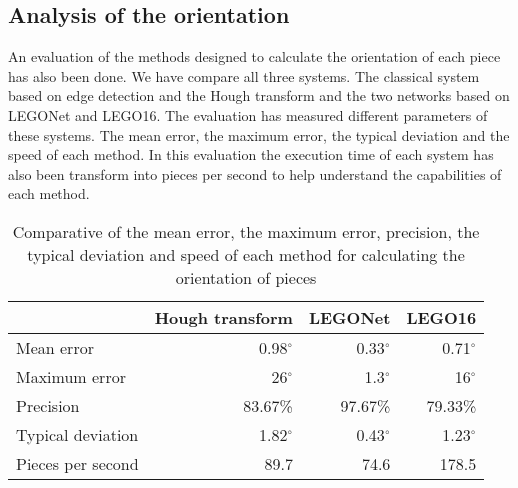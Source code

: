 {%

\subsection*{Analysis of the orientation}
An evaluation of the methods designed to calculate the orientation of each piece has also been done. We have compare all three systems. The classical system based on edge detection and the Hough transform and the two networks based on LEGONet and LEGO16. The evaluation has measured different parameters of these systems. The mean error, the maximum error, the typical deviation and the speed of each method. In this evaluation the execution time of each system has also been transform into pieces per second to help understand the capabilities of each method.

\begin{table}[ht] %
  \centering
    \begin{tabular}{|l|r|r|r|}
    \cline{2-4} \multicolumn{1}{r|}{} & \multicolumn{1}{l|}{Hough transform} & \multicolumn{1}{l|}{LEGONet} & \multicolumn{1}{l|}{LEGO16}\\	
    \hline
    Mean error & 0.98$^{\circ}$  & 0.33$^{\circ}$ & 0.71$^{\circ}$ \\
    \hline
    Maximum error & 26$^{\circ}$  & 1.3$^{\circ}$ & 16$^{\circ}$ \\
    \hline
    Precision & 83.67\% & 97.67\% & 79.33\% \\
    \hline
    Typical deviation & 1.82$^{\circ}$ & 0.43$^{\circ}$ & 1.23$^{\circ}$ \\
    \hline
    Pieces per second	&	89.7	&	74.6	&	178.5	\\
    \hline
    \end{tabular}%
  \label{tab:abs4}%
  \caption{Comparative of the mean error, the maximum error, precision, the typical deviation and speed of each method for calculating the orientation of pieces}
\end{table}


}
